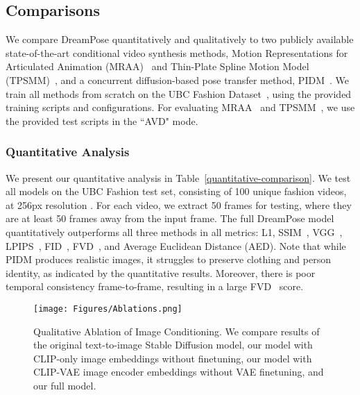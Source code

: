     \subsection{Comparisons}
        We compare DreamPose quantitatively and qualitatively to two publicly available state-of-the-art conditional video synthesis methods, Motion Representations for Articulated Animation (MRAA)~\cite{articulated_animation} and Thin-Plate Spline Motion Model (TPSMM)~\cite{thin_plate_spline}, and a concurrent diffusion-based pose transfer method, PIDM~\cite{pose-transfer-dm}. We train all methods from scratch on the UBC Fashion Dataset~\cite{ubc_fashion}, using the provided training scripts and configurations. For evaluating MRAA~\cite{articulated_animation} and TPSMM~\cite{thin_plate_spline}, we use the provided test scripts in the ``AVD" mode. 
        
        \subsubsection{Quantitative Analysis} We present our quantitative analysis in Table~\ref{quantitative-comparison}. We test all models on the UBC Fashion test set, consisting of 100 unique fashion videos, at 256px resolution \cite{ubc_fashion}. For each video, we extract 50 frames for testing, where they are at least 50 frames away from the input frame. The full DreamPose model quantitatively outperforms all three methods in all metrics: L1, SSIM~\cite{ssim}, VGG~\cite{vgg}, LPIPS~\cite{lpips}, FID~\cite{fid}, FVD~\cite{FVD}, and Average Euclidean Distance (AED). Note that while PIDM produces realistic images, it struggles to preserve clothing and person identity, as indicated by the quantitative results. Moreover, there is poor temporal consistency frame-to-frame, resulting in a large FVD~\cite{FVD} score.

        
        \begin{figure*}[t]
            \begin{center}
                \texttt{[image: Figures/Ablations.png]}
            \end{center}
           \caption{Qualitative Ablation of Image Conditioning. We compare results of the original text-to-image Stable Diffusion model, our model with CLIP-only image embeddings without finetuning, our model with CLIP-VAE image encoder embeddings without VAE finetuning, and our full model.}
           \hspace{2em}
        \label{fig:ablations}
        \end{figure*}

